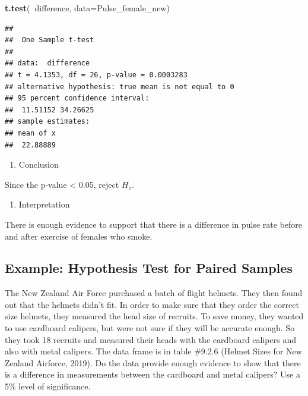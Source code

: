 \documentclass[]{book}
\newenvironment{Shaded}{\begin{snugshade}}{\end{snugshade}}
\newcommand{\DataTypeTok}[1]{\textcolor[rgb]{0.13,0.29,0.53}{#1}}
\newcommand{\KeywordTok}[1]{\textcolor[rgb]{0.13,0.29,0.53}{\textbf{#1}}}
\newcommand{\NormalTok}[1]{#1}
\newcommand{\OperatorTok}[1]{\textcolor[rgb]{0.81,0.36,0.00}{\textbf{#1}}}
\providecommand{\tightlist}{%
  \setlength{\itemsep}{0pt}\setlength{\parskip}{0pt}}
\begin{document}
\begin{Shaded}
\begin{Highlighting}[]
\KeywordTok{t.test}\NormalTok{(}\OperatorTok{~}\NormalTok{difference, }\DataTypeTok{data=}\NormalTok{Pulse_female_new)}
\end{Highlighting}
\end{Shaded}

\begin{verbatim}
## 
##  One Sample t-test
## 
## data:  difference
## t = 4.1353, df = 26, p-value = 0.0003283
## alternative hypothesis: true mean is not equal to 0
## 95 percent confidence interval:
##  11.51152 34.26625
## sample estimates:
## mean of x 
##  22.88889
\end{verbatim}

\begin{enumerate}
\def\labelenumi{\arabic{enumi}.}
\setcounter{enumi}{4}
\tightlist
\item
  Conclusion
\end{enumerate}

Since the p-value \textless{} 0.05, reject \(H_o\).

\begin{enumerate}
\def\labelenumi{\arabic{enumi}.}
\setcounter{enumi}{5}
\tightlist
\item
  Interpretation
\end{enumerate}

There is enough evidence to support that there is a difference in pulse rate before and after exercise of females who smoke.

\hypertarget{example-hypothesis-test-for-paired-samples-1}{%
\subsection{Example: Hypothesis Test for Paired Samples}\label{example-hypothesis-test-for-paired-samples-1}}

The New Zealand Air Force purchased a batch of flight helmets. They then found out that the helmets didn't fit. In order to make sure that they order the correct size helmets, they measured the head size of recruits. To save money, they wanted to use cardboard calipers, but were not sure if they will be accurate enough. So they took 18 recruits and measured their heads with the cardboard calipers and also with metal calipers. The data frame is in table \#9.2.6 (Helmet Sizes for New Zealand Airforce, 2019). Do the data provide enough evidence to show that there is a difference in measurements between the cardboard and metal calipers? Use a 5\% level of significance.
\end{document}
